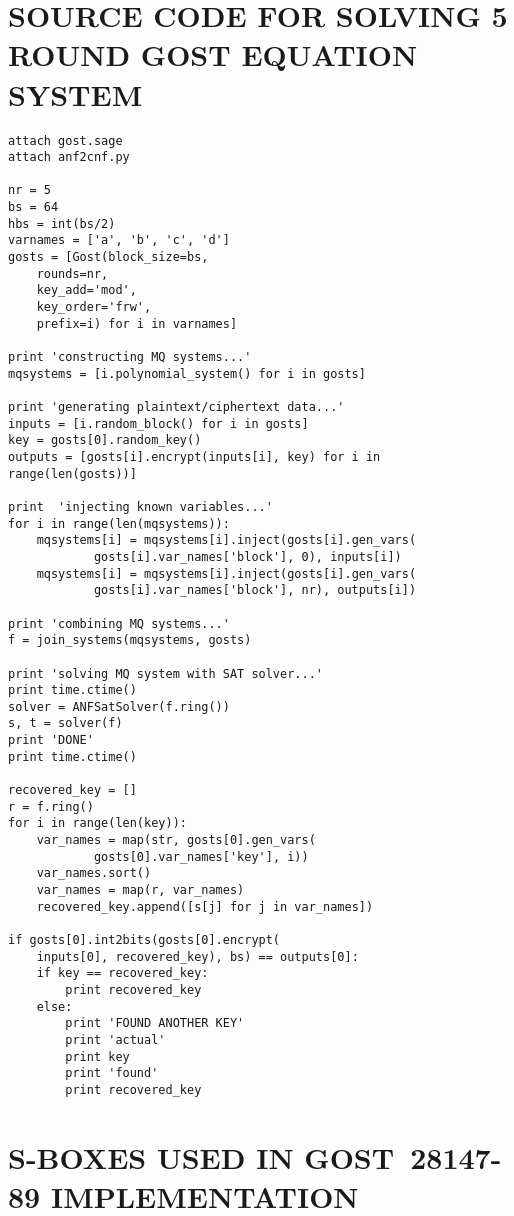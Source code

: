 \begin{appendices}
\chapter{SOURCE CODE FOR SOLVING 5 ROUND GOST EQUATION SYSTEM}
\label{app:solving-sat}

\begin{lstlisting}
attach gost.sage
attach anf2cnf.py

nr = 5
bs = 64
hbs = int(bs/2)
varnames = ['a', 'b', 'c', 'd']
gosts = [Gost(block_size=bs, 
    rounds=nr, 
    key_add='mod', 
    key_order='frw', 
    prefix=i) for i in varnames]

print 'constructing MQ systems...'
mqsystems = [i.polynomial_system() for i in gosts]

print 'generating plaintext/ciphertext data...'
inputs = [i.random_block() for i in gosts]
key = gosts[0].random_key()
outputs = [gosts[i].encrypt(inputs[i], key) for i in range(len(gosts))]

print  'injecting known variables...'
for i in range(len(mqsystems)):
    mqsystems[i] = mqsystems[i].inject(gosts[i].gen_vars(
            gosts[i].var_names['block'], 0), inputs[i])
    mqsystems[i] = mqsystems[i].inject(gosts[i].gen_vars(
            gosts[i].var_names['block'], nr), outputs[i])

print 'combining MQ systems...'
f = join_systems(mqsystems, gosts)

print 'solving MQ system with SAT solver...'
print time.ctime()
solver = ANFSatSolver(f.ring())
s, t = solver(f)
print 'DONE'
print time.ctime()

recovered_key = []
r = f.ring()
for i in range(len(key)):
    var_names = map(str, gosts[0].gen_vars(
            gosts[0].var_names['key'], i))
    var_names.sort()
    var_names = map(r, var_names)
    recovered_key.append([s[j] for j in var_names])

if gosts[0].int2bits(gosts[0].encrypt(
    inputs[0], recovered_key), bs) == outputs[0]:
    if key == recovered_key:
        print recovered_key
    else:
        print 'FOUND ANOTHER KEY'
        print 'actual'
        print key
        print 'found'
        print recovered_key
\end{lstlisting}

\chapter{S-BOXES USED IN GOST~28147-89 IMPLEMENTATION}
\label{app:gost-sboxes}


\end{appendices}

